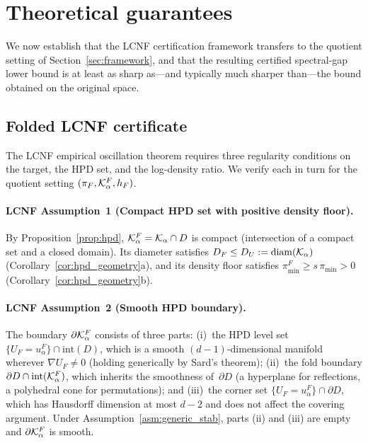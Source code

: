 %  

\section{Theoretical guarantees}
\label{sec:theory}

We now establish that the LCNF certification framework
\citep{LCNF} transfers to the quotient setting of
Section~\ref{sec:framework}, and that the resulting certified
spectral-gap lower bound is at least as sharp as---and typically
much sharper than---the bound obtained on the original space.


\subsection{Folded LCNF certificate}
\label{sec:folded_cert}

The LCNF empirical oscillation theorem \citep[Theorem~5.1]{LCNF}
requires three regularity conditions on the target, the HPD set,
and the log-density ratio.  We verify each in turn for the quotient
setting $(\pi_F, \mathcal{K}_\alpha^F, h_F)$.

\paragraph{LCNF Assumption~1 (Compact HPD set with positive density floor).}
By Proposition~\ref{prop:hpd}, $\mathcal{K}_\alpha^F = \mathcal{K}_\alpha \cap D$ is
compact (intersection of a compact set and a closed domain).
Its diameter satisfies $D_F \leq D_U := \mathrm{diam}(\mathcal{K}_\alpha)$
(Corollary~\ref{cor:hpd_geometry}a), and its density floor satisfies
$\pi_{\min}^F \geq s\,\pi_{\min} > 0$
(Corollary~\ref{cor:hpd_geometry}b).

\paragraph{LCNF Assumption~2 (Smooth HPD boundary).}
The boundary $\partial\mathcal{K}_\alpha^F$ consists of three parts:
(i)~the HPD level set $\{U_F = u_\alpha^F\} \cap \mathrm{int}(D)$,
which is a smooth $(d{-}1)$-dimensional manifold wherever
$\nabla U_F \neq 0$ (holding generically by Sard's theorem);
(ii)~the fold boundary $\partial D \cap \mathrm{int}(\mathcal{K}_\alpha^F)$,
which inherits the smoothness of~$\partial D$ (a hyperplane for
reflections, a polyhedral cone for permutations); and
(iii)~the corner set $\{U_F = u_\alpha^F\} \cap \partial D$,
which has Hausdorff dimension at most $d{-}2$ and does not affect
the covering argument.
Under Assumption~\ref{asm:generic_stab}, parts (ii) and (iii)
are empty and $\partial\mathcal{K}_\alpha^F$ is smooth.


